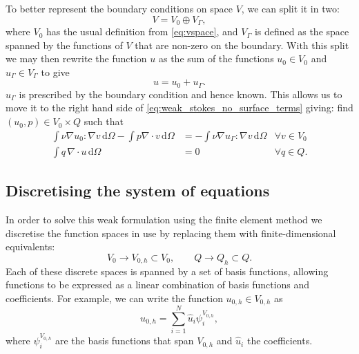\documentclass[thesis]{subfiles}
\begin{document}
To better represent the boundary conditions on space $V$, we can split it in two:
\begin{equation*}
  V = V_0 \oplus V_\Gamma,
\end{equation*}
where $V_0$ has the usual definition from \cref{eq:vspace}, and $V_\Gamma$ is defined as the space spanned by the functions of $V$ that are non-zero on the boundary.
With this split we may then rewrite the function $u$ as the sum of the functions $u_0 \in V_0$ and $u_\Gamma \in V_\Gamma$ to give
\begin{equation*}
  u = u_0 + u_\Gamma.
\end{equation*}
$u_\Gamma$ is prescribed by the boundary condition and hence known.
This allows us to move it to the right hand side of \cref{eq:weak_stokes_no_surface_terms} giving: find $(u_0, p) \in V_0 \times Q$ such that
\begin{equation} \label{eq:weak_stokes}
  \begin{aligned}
    \int \nu \nabla u_0 : \nabla v \, \textrm{d}\Omega
    - \int p \nabla \cdot v \, \textrm{d}\Omega
    &=
    - \int \nu \nabla u_\Gamma : \nabla v \, \textrm{d}\Omega
    &\forall v \in V_0 \\
    \int q \, \nabla \cdot u \, \textrm{d}\Omega
    &= 0
    &\forall q \in Q.
  \end{aligned}
\end{equation}

\subsection{Discretising the system of equations}

In order to solve this weak formulation using the finite element method we discretise the function spaces in use by replacing them with finite-dimensional equivalents:
\begin{equation*}
  V_0 \to V_{0,h} \subset V_0,
  \quad
  \quad
  Q \to Q_h \subset Q.
\end{equation*}
Each of these discrete spaces is spanned by a set of basis functions, allowing functions to be expressed as a linear combination of basis functions and coefficients.
For example, we can write the function $u_{0,h} \in V_{0,h}$ as
\begin{equation*}
  u_{0,h} = \sum^N_{i=1} \hat u_i \psi^{V_{0,h}}_i,
\end{equation*}
where $\psi^{V_{0,h}}_i$ are the basis functions that span $V_{0,h}$ and $\hat u_i$ the coefficients.
\end{document}
